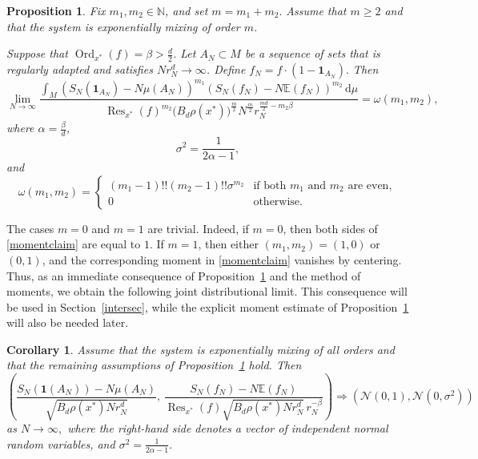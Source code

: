\documentclass[11pt,twoside,a4paper,reqno]{amsart}
\newtheorem{corollary}[theorem]{Corollary}
\newtheorem{proposition}[theorem]{Proposition}
\newcommand{\Ord}{\operatorname{Ord}}
\newcommand{\Res}{\operatorname{Res}}
\renewcommand{\d}{\, \text{d}}
\newcommand{\E}{\mathbb{E}}
\def\one{{\mathbf{1}}}
\begin{document}
\begin{proposition}\label{momentprop}
Fix $m_1,m_2\in \mathbb N$, and set $m=m_1+m_2.$ Assume that $m\geq2$ and that the system is exponentially mixing of order $m$.

Suppose that $\Ord_{x^*}(f)=\beta>\frac{d}{2}$. Let $A_N\subset M$ be a sequence of sets that is regularly adapted and satisfies $N r_N^{d} \rightarrow \infty$. Define $f_N=f \cdot \left(1-\one_{A_N}\right).$ Then
\begin{equation}\label{momentclaim}
\lim_{N\rightarrow\infty} \frac{\int_M \left(S_N(\one_{A_N}) - N \mu(A_N) \right)^{m_1} \left(S_N(f_N) - N \E( f_N)\right)^{m_2}\d\mu}{\Res_{x^*}(f)^{m_2}\bigl(B_d \rho(x^*)\bigr)^{\frac{m}{2}} N^{\frac{m}{2}} r_N^{\frac{md}{2}-m_2\beta }}=\omega(m_1,m_2),
\end{equation}
where $\alpha=\frac{\beta}{d}$,
\begin{equation*}
\sigma^2= \frac{1}{2\alpha-1},
\end{equation*}
and \begin{equation*}
\omega(m_1,m_2)= \begin{cases}
(m_1 - 1)!! (m_2-1)!! \sigma^{m_2} & \text{if both } m_1 \text{ and } m_2 \text{ are even},\\
0 & \text{otherwise}.
\end{cases}
\end{equation*}
\end{proposition}


The cases $m=0$ and $m=1$ are trivial. Indeed, if $m=0$, then both sides of \eqref{momentclaim} are equal to $1$. If $m=1$, then either $(m_1,m_2)=(1,0)$ or $(0,1)$, and the corresponding moment in \eqref{momentclaim} vanishes by centering. Thus, as an immediate consequence of Proposition~\ref{momentprop} and the method of moments, we obtain the following joint distributional limit. This consequence will be used in Section~\ref{intersec}, while the explicit moment estimate of Proposition~\ref{momentprop} will also be needed later.




\begin{corollary}\label{CLTgenrem}
Assume that the system is exponentially mixing of all orders and that the remaining assumptions of Proposition~\ref{momentprop} hold. Then
$$\left(\frac{S_N(\one(A_N)) - N \mu(A_N)}{\sqrt{B_d\rho(x^*)N r_N^d}},\,\frac{S_N(f_N) - N \E(f_N)}
{\Res_{x^*}(f)\sqrt{B_d\rho(x^*)N r_N^d}\, r_N^{-\beta}}\right) \Rightarrow (\mathcal{N}(0,1),\mathcal{N}(0,\sigma^2))
$$
as $N\to\infty,$ where the right-hand side denotes a vector of independent normal random variables, and
$\sigma^2=\frac{1}{2\alpha-1}.$
\end{corollary}
\end{document}
